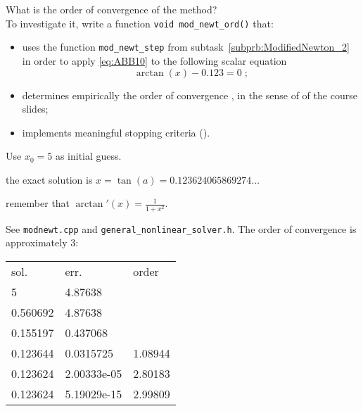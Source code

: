 \begin{problem}

\begin{subproblem}[2] \label{subprb:ModifiedNewton_3}
What is the order of convergence of the method?\\
To investigate it, write a \Cpp function \verb|void mod_newt_ord()|
that:
\begin{itemize}
\item uses the function \verb|mod_newt_step| from subtask~\ref{subprb:ModifiedNewton_2} in order to apply \eqref{eq:ABB10} to the following scalar equation 
  $$\operatorname{arctan}(x) - 0.123 = 0\;;$$
\item determines empirically the order of convergence%
  , in the sense of  of the course slides;
\item implements meaningful stopping criteria ().
\end{itemize}
Use $x_0=5$ as initial guess.
\vspace{1.5ex}

\begin{hint}
  the exact solution is \; $x=\tan(a)=0.123624065869274\dots$\\
\end{hint}
\begin{hint}
  remember that \; $\operatorname{arctan}'(x)=\frac1{1+x^2}$.%
\end{hint}

\cprotEnv \begin{solution}
See \verb|modnewt.cpp| and \verb|general_nonlinear_solver.h|.
The order of convergence is approximately 3:\\
\begin{center}
\begin{tabular}{lll}
           sol. &          err.  &         order \\
              5 &       4.87638 & \\
       0.560692 &       4.87638 & \\
       0.155197 &      0.437068 & \\
       0.123644 &    0.0315725   &     1.08944 \\
       0.123624 &  2.00333e-05   &     2.80183 \\
       0.123624 &   5.19029e-15   &     2.99809 \\
\end{tabular}
\end{center}


\end{solution}
\end{subproblem}
\end{problem}
